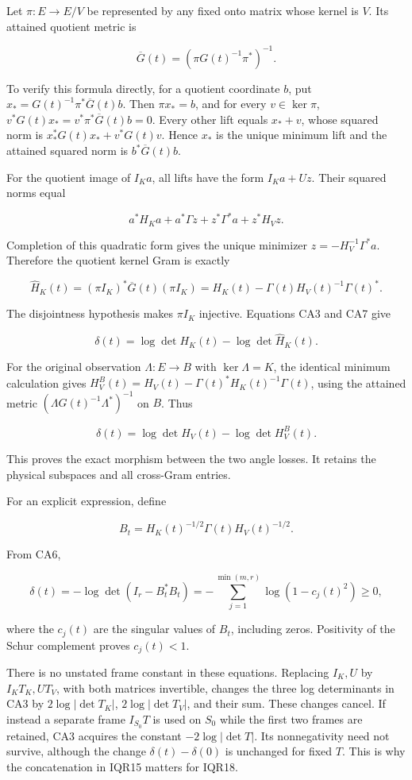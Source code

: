 \documentclass[11pt]{article}
\begin{document}
Let \(\pi:E\to E/V\) be represented by any fixed onto matrix whose kernel is \(V\). Its attained quotient metric is

\[
\overline G(t)=(\pi G(t)^{-1}\pi^*)^{-1}.
\tag{CA8}
\]

To verify this formula directly, for a quotient coordinate \(b\), put \(x_*=G(t)^{-1}\pi^*\overline G(t)b\). Then \(\pi x_*=b\), and for every \(v\in\ker\pi\), \(v^*G(t)x_*=v^*\pi^*\overline G(t)b=0\). Every other lift equals \(x_*+v\), whose squared norm is \(x_*^*G(t)x_*+v^*G(t)v\). Hence \(x_*\) is the unique minimum lift and the attained squared norm is \(b^*\overline G(t)b\).

For the quotient image of \(I_Ka\), all lifts have the form \(I_Ka+Uz\). Their squared norms equal

\[
a^*H_Ka+a^*\Gamma z+z^*\Gamma^*a+z^*H_Vz.
\]

Completion of this quadratic form gives the unique minimizer \(z=-H_V^{-1}\Gamma^*a\). Therefore the quotient kernel Gram is exactly

\[
\widehat H_K(t)
=(\pi I_K)^*\overline G(t)(\pi I_K)
=H_K(t)-\Gamma(t)H_V(t)^{-1}\Gamma(t)^*.
\tag{CA9}
\]

The disjointness hypothesis makes \(\pi I_K\) injective. Equations CA3 and CA7 give

\[
\delta(t)=\log\det H_K(t)-\log\det\widehat H_K(t).
\tag{CA10}
\]

For the original observation \(\Lambda:E\to B\) with \(\ker\Lambda=K\), the identical minimum calculation gives \(H_V^B(t)=H_V(t)-\Gamma(t)^*H_K(t)^{-1}\Gamma(t)\), using the attained metric \((\Lambda G(t)^{-1}\Lambda^*)^{-1}\) on \(B\). Thus

\[
\delta(t)=\log\det H_V(t)-\log\det H_V^B(t).
\tag{CA11}
\]

This proves the exact morphism between the two angle losses. It retains the physical subspaces and all cross-Gram entries.

For an explicit expression, define

\[
B_t=H_K(t)^{-1/2}\Gamma(t)H_V(t)^{-1/2}.
\]

From CA6,

\[
\delta(t)=-\log\det(I_r-B_t^*B_t)
=-\sum_{j=1}^{\min(m,r)}\log(1-c_j(t)^2)\ge0,
\tag{CA12}
\]

where the \(c_j(t)\) are the singular values of \(B_t\), including zeros. Positivity of the Schur complement proves \(c_j(t)<1\).

There is no unstated frame constant in these equations. Replacing \(I_K,U\) by \(I_KT_K,UT_V\), with both matrices invertible, changes the three log determinants in CA3 by \(2\log|\det T_K|\), \(2\log|\det T_V|\), and their sum. These changes cancel. If instead a separate frame \(I_{S_0}T\) is used on \(S_0\) while the first two frames are retained, CA3 acquires the constant \(-2\log|\det T|\). Its nonnegativity need not survive, although the change \(\delta(t)-\delta(0)\) is unchanged for fixed \(T\). This is why the concatenation in IQR15 matters for IQR18.
\end{document}
